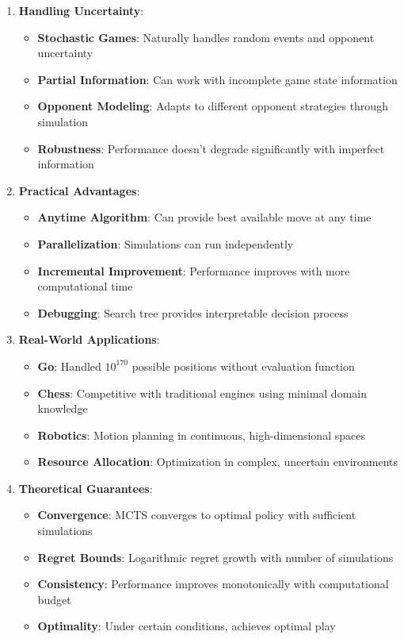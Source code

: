 \begin{itemize}
\begin{enumerate}
        \item \textbf{Handling Uncertainty}:
        \begin{itemize}
            \item \textbf{Stochastic Games}: Naturally handles random events and opponent uncertainty
            \item \textbf{Partial Information}: Can work with incomplete game state information
            \item \textbf{Opponent Modeling}: Adapts to different opponent strategies through simulation
            \item \textbf{Robustness}: Performance doesn't degrade significantly with imperfect information
        \end{itemize}
        
        \item \textbf{Practical Advantages}:
        \begin{itemize}
            \item \textbf{Anytime Algorithm}: Can provide best available move at any time
            \item \textbf{Parallelization}: Simulations can run independently
            \item \textbf{Incremental Improvement}: Performance improves with more computational time
            \item \textbf{Debugging}: Search tree provides interpretable decision process
        \end{itemize}
        
        \item \textbf{Real-World Applications}:
        \begin{itemize}
            \item \textbf{Go}: Handled $10^{170}$ possible positions without evaluation function
            \item \textbf{Chess}: Competitive with traditional engines using minimal domain knowledge
            \item \textbf{Robotics}: Motion planning in continuous, high-dimensional spaces
            \item \textbf{Resource Allocation}: Optimization in complex, uncertain environments
        \end{itemize}
        
        \item \textbf{Theoretical Guarantees}:
        \begin{itemize}
            \item \textbf{Convergence}: MCTS converges to optimal policy with sufficient simulations
            \item \textbf{Regret Bounds}: Logarithmic regret growth with number of simulations
            \item \textbf{Consistency}: Performance improves monotonically with computational budget
            \item \textbf{Optimality}: Under certain conditions, achieves optimal play
        \end{itemize}
    \end{enumerate}
\end{itemize}